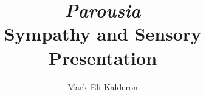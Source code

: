 \documentclass[12pt]{book}
\newcommand\myauthor{Mark Eli Kalderon}
\begin{document}
\author{\myauthor}
\title{\emph{Parousia}\\
Sympathy and Sensory Presentation}
\date{}

\maketitle
{}
\frontmatter

\tableofcontents



\mainmatter









\backmatter


\nocite{Hamlyn:2002ys}
\nocite{Ross:1906fk}
\nocite{Ross:1961uq}
\nocite{Ross:1924aa}
\nocite{Arnim:1964ad}
\nocite{Arnim:1964bx}
\nocite{Arnim:1964cp}
\nocite{Jansen:1922wq}

 


\end{document}
